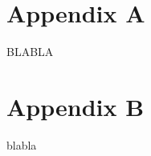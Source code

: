 \documentclass{article}
\begin{document}
\begin{refsection}


\newrefcontext[sorting=nyt] %
\printbibliography[heading = bibintoc] %

\end{refsection}

\newpage
\setcounter{page}{1}
\renewcommand{\thepage}{A-\arabic{page}}
\linenumbers*
\addappendix

\renewcommand{\thetable}{A.\arabic{table}}
\setcounter{table}{0}
\renewcommand{\theequation}{A.\arabic{equation}}
\setcounter{equation}{0}

\begin{refsection}
\section*{Appendix A}
BLABLA

\section*{Appendix B}
blabla \parencite{leontief_1936}

\nolinenumbers
\newpage
\newrefcontext[sorting=nyt] %
\printbibliography[title = References in appendix]

\end{refsection}
\end{document}
